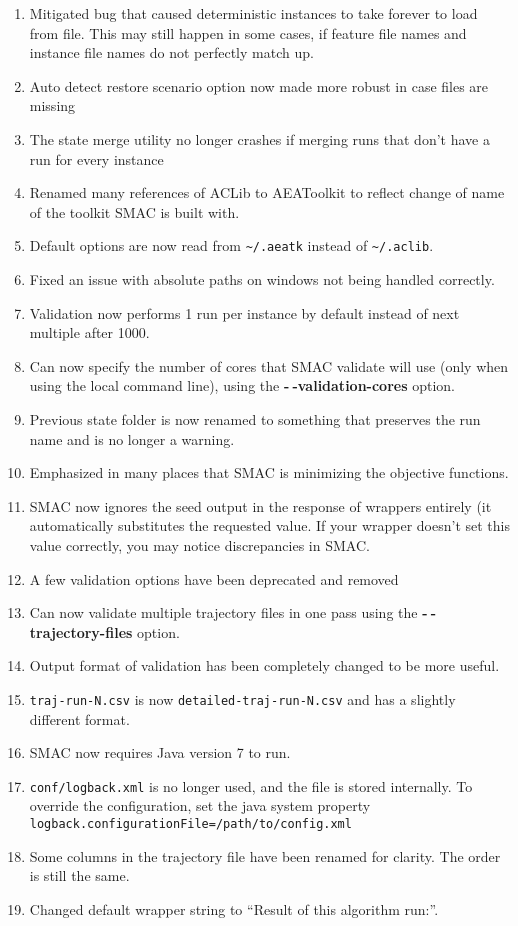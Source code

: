 \documentclass[11pt,letterpaper,oneside]{article}
\begin{document}
\begin{description}
\begin{enumerate}
          		\item Mitigated bug that caused deterministic instances to take forever to load from file. This may still happen in some cases, if feature file names and instance file names do not perfectly match up.
          		\item Auto detect restore scenario option now made more robust in case files are missing
          		\item The state merge utility no longer crashes if merging runs that don't have a run for every instance
          		\item Renamed many references of ACLib to AEAToolkit to reflect change of name of the toolkit SMAC is built with.
          		\item Default options are now read from \texttt{\textasciitilde/.aeatk} instead of \texttt{\textasciitilde/.aclib}.
				\item Fixed an issue with absolute paths on windows not being handled correctly.
				\item Validation now performs 1 run per instance by default instead of next multiple after 1000.
				\item Can now specify the number of cores that SMAC validate will use (only when using the local command line), using the \textbf{-$~\!$-validation-cores} option.
				\item Previous state folder is now renamed to something that preserves the run name and is no longer a warning.
				\item Emphasized in many places that SMAC is minimizing the objective functions.
				\item SMAC now ignores the seed output in the response of wrappers entirely (it automatically substitutes the requested value. If your wrapper doesn't set this value correctly, you may notice discrepancies in SMAC.
				\item A few validation options have been deprecated and removed
				\item Can now validate multiple trajectory files in one pass using the \textbf{-$~\!$-trajectory-files} option. 
				\item Output format of validation has been completely changed to be more useful.
				\item \texttt{traj-run-N.csv} is now \texttt{detailed-traj-run-N.csv} and has a slightly different format.
				\item SMAC now requires Java version 7 to run.
				\item \texttt{conf/logback.xml} is no longer used, and the file is stored internally. To override the configuration, set the java system property \texttt{logback.configurationFile=/path/to/config.xml}
				\item Some columns in the trajectory file have been renamed for clarity. The order is still the same.
				\item Changed default wrapper string to ``Result of this algorithm run:''.
				

\end{enumerate}
\end{description}
\end{document}
